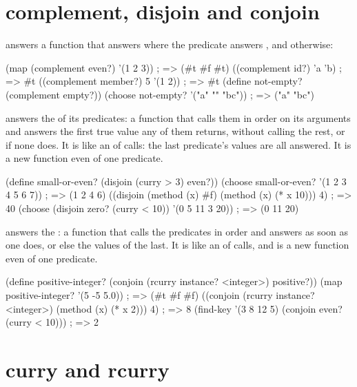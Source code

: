 \section{complement, disjoin and conjoin}\label{sec:functional-logic}

 answers a function that answers
 where the predicate answers , and 
otherwise:

\begin{dylan}
(map (complement even?) '(1 2 3))          ; => (#t #f #t)
((complement id?) 'a 'b)                   ; => #t
((complement member?) 5 '(1 2))            ; => #t
(define not-empty? (complement empty?))
(choose not-empty? '("a" "" "bc"))         ; => ("a" "bc")
\end{dylan}

 answers the 
of its predicates: a function that calls them in order on its arguments
and answers the first true value any of them returns, without calling
the rest, or  if none does. It is like an  of calls:
the last predicate's values are all answered. It is a new function even
of one predicate.

\begin{dylan}
(define small-or-even? (disjoin (curry > 3) even?))
(choose small-or-even? '(1 2 3 4 5 6 7))           ; => (1 2 4 6)
((disjoin (method (x) #f) (method (x) (* x 10))) 4) ; => 40
(choose (disjoin zero? (curry < 10)) '(0 5 11 3 20)) ; => (0 11 20)
\end{dylan}

 answers the :
a function that calls the predicates in order and answers  as
soon as one does, or else the values of the last. It is like an
 of calls, and is a new function even of one predicate.

\begin{dylan}
(define positive-integer? (conjoin (rcurry instance? <integer>) positive?))
(map positive-integer? '(5 -5 5.0))                    ; => (#t #f #f)
((conjoin (rcurry instance? <integer>) (method (x) (* x 2))) 4)   ; => 8
(find-key '(3 8 12 5) (conjoin even? (curry < 10)))    ; => 2
\end{dylan}

\section{curry and rcurry}\label{sec:functional-curry}

